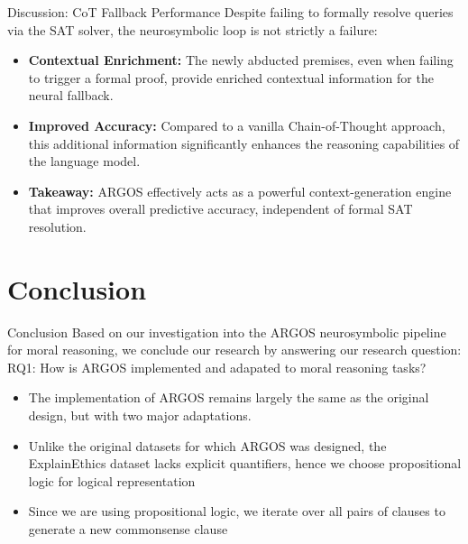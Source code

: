 \documentclass{beamer}
\begin{document}
    \begin{frame}{Discussion: CoT Fallback Performance}
        Despite failing to formally resolve queries via the SAT solver, the neurosymbolic loop is not strictly a failure:
        \vspace{0.5cm}
        \begin{itemize}
            \item \textbf{Contextual Enrichment:} The newly abducted premises, even when failing to trigger a formal proof, provide enriched contextual information for the neural fallback.
            \item \textbf{Improved Accuracy:} Compared to a vanilla Chain-of-Thought approach, this additional information significantly enhances the reasoning capabilities of the language model.
            \item \textbf{Takeaway:} ARGOS effectively acts as a powerful context-generation engine that improves overall predictive accuracy, independent of formal SAT resolution.
        \end{itemize}
    \end{frame}

    \section{Conclusion}

    \begin{frame}{Conclusion}   
        Based on our investigation into the ARGOS neurosymbolic pipeline for moral reasoning, we conclude our research by answering our research question:
        \\
        RQ1: How is ARGOS implemented and adapated to moral reasoning tasks? 
        \begin{itemize}
            \item The implementation of ARGOS remains largely the same as the original design, but with two major adaptations.
            \item Unlike the original datasets for which ARGOS was designed, the ExplainEthics dataset lacks explicit quantifiers, hence we choose propositional logic for logical representation
            \item Since we are using propositional logic, we iterate over all pairs of clauses to generate a new commonsense clause 
        \end{itemize}
    \end{frame}
\end{document}
